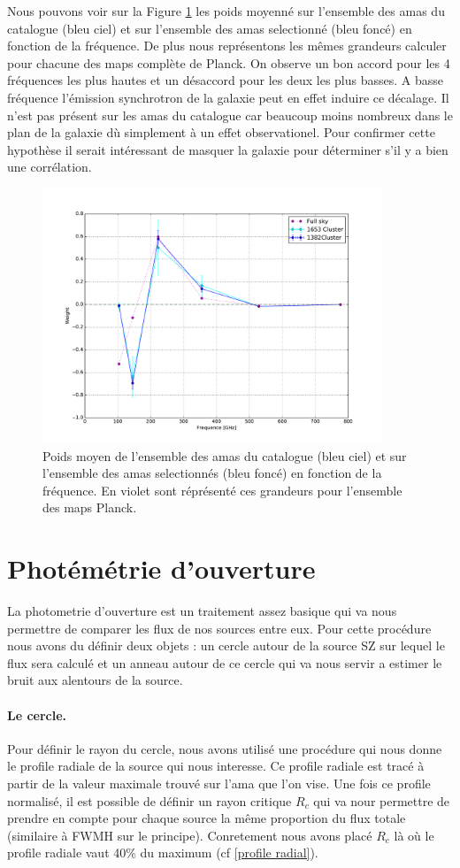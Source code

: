 \documentclass[a4paper,11pt]{article}
\begin{document}
Nous pouvons voir sur la Figure \ref{w_full} les poids moyenné sur
l'ensemble des amas du catalogue (bleu ciel) et sur l'ensemble des
amas selectionné (bleu foncé) en fonction de la fréquence. De plus
nous représentons les mêmes grandeurs calculer pour chacune des maps
complète de Planck. On observe un bon accord pour les 4 fréquences les
plus hautes et un désaccord pour les deux les plus basses. A basse
fréquence l'émission synchrotron de la galaxie peut en effet induire
ce décalage. Il n'est pas présent sur les amas du catalogue car
beaucoup moins nombreux dans le plan de la galaxie dù simplement à un
effet observationel. Pour confirmer cette hypothèse il serait
intéressant de masquer la galaxie pour déterminer s'il y a bien une
corrélation.  

\begin{figure}[h!]
  \centering
  \label{w_full}
  \includegraphics[width=4in]{w_full.pdf}
  \caption{Poids moyen de l'ensemble des amas du catalogue (bleu ciel) et sur
    l'ensemble des amas selectionnés (bleu foncé) en fonction
    de la fréquence. En violet sont réprésenté ces grandeurs pour
    l'ensemble des maps Planck.}
\end{figure}
  

\section{Photémétrie d'ouverture}
La photometrie d'ouverture est un traitement assez basique qui va nous 
permettre de comparer les flux de nos sources entre eux.
Pour cette procédure nous avons du définir deux objets : un cercle autour de la source SZ
sur lequel le flux sera calculé et un anneau autour de ce cercle qui va nous servir a estimer le bruit 
aux alentours de la source.

\paragraph{Le cercle.} Pour définir le rayon du cercle, nous avons utilisé une procédure qui nous donne le
profile radiale de la source qui nous interesse. Ce profile radiale est tracé à partir de la valeur maximale trouvé
sur l'ama que l'on vise. Une fois ce profile normalisé, il est possible de définir un rayon critique
$R_c$ qui va nour permettre de prendre en compte pour chaque source la même proportion du flux totale
(similaire à FWMH sur le principe). Conretement nous avons placé $R_c$ là où le profile radiale vaut 40\% du maximum
(cf \ref{profile radial}). \\ 
\end{document}
